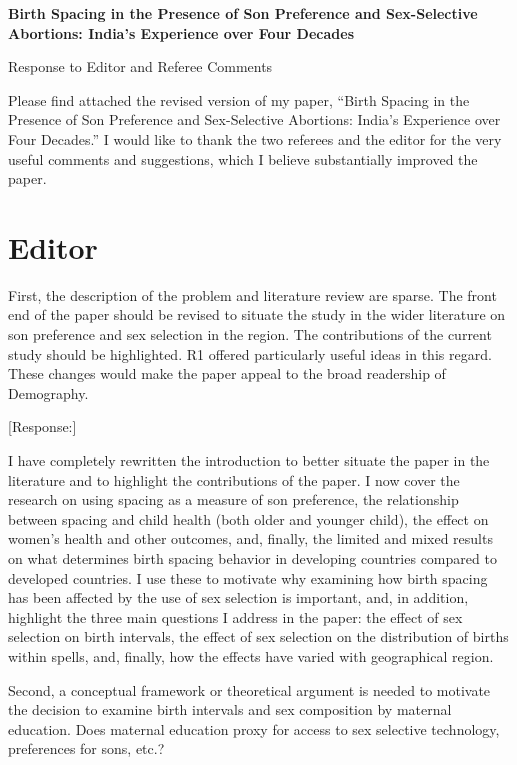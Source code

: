 \documentclass[letterpaper,12pt]{article}
\title{} \author{}
\begin{document}
\begin{center} \textbf{\large Birth Spacing in the Presence of Son
Preference and 
Sex-Selective Abortions: India's Experience over Four Decades}
\end{center}

\begin{center} Response to Editor and Referee Comments \end{center}

\noindent Please find attached the revised version of my paper,
``Birth Spacing in the Presence of Son Preference and Sex-Selective
Abortions:
India's Experience over Four Decades.''
I would like to thank the two referees and the editor for the very useful comments and 
suggestions, which I believe substantially improved the paper.

\section*{Editor}

First, the description of the problem and literature review are sparse.
The front end of the paper should be revised to situate the study in the
wider literature on son preference and sex selection in the region. The
contributions of the current study should be highlighted. R1 offered
particularly useful ideas in this regard. These changes would make the
paper appeal to the broad readership of Demography.

[Response:]

I have completely rewritten the introduction to better situate the paper in the literature
and to highlight the contributions of the paper.
I now cover the research on using spacing as a measure of son preference, the 
relationship between spacing and child health (both older and younger child), the 
effect on women's health and other outcomes, and, finally, the limited and mixed results
on what determines birth spacing behavior in developing countries compared to developed 
countries.
I use these to motivate why examining how birth spacing has been affected by the use of
sex selection is important, and, in addition, highlight the three main questions I address 
in the paper: the effect of sex selection on birth intervals, the effect of sex selection
on the distribution of births within spells, and, finally, how the effects have varied
with geographical region.


Second, a conceptual framework or theoretical argument is needed to
motivate the decision to examine birth intervals and sex composition by
maternal education. Does maternal education proxy for access to sex
selective technology, preferences for sons, etc.? 
\end{document}
